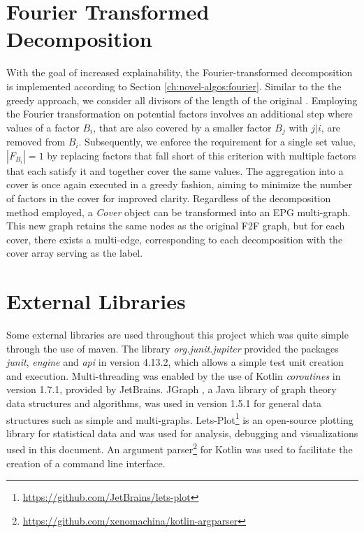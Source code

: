 \section{Fourier Transformed Decomposition}
\label{ch:Implementation:fourier-transform}
With the goal of increased explainability, the Fourier-transformed decomposition is implemented according to Section \ref{ch:novel-algos:fourier}.
Similar to the the greedy approach, we consider all divisors of the length of the original \DFA.
Employing the Fourier transformation on potential factors involves an additional step where values of a factor $B_i$, that are also covered by a smaller factor $B_j$ with $j|i$, are removed from $B_i$.
Subsequently, we enforce the requirement for a single set value, $|F_{B_i}| = 1$ by replacing factors that fall short of this criterion with multiple factors that each satisfy it and together cover the same values.
The aggregation into a cover is once again executed in a greedy fashion, aiming to minimize the number of factors in the cover for improved clarity.
Regardless of the decomposition method employed, a \textit{Cover} object can be transformed into an EPG multi-graph.
This new graph retains the same nodes as the original F2F graph, but for each cover, there exists a multi-edge, corresponding to each decomposition with the cover array serving as the label.

\section{External Libraries}
\label{ch:Implementation:external-libs}
Some external libraries are used throughout this project which was quite simple through the use of maven.
The library \emph{org.junit.jupiter} provided the packages \emph{junit}, \emph{engine} and \emph{api} in version 4.13.2, which allows a simple test unit creation and execution. Multi-threading was enabled by the use of Kotlin \emph{coroutines} in version 1.7.1, provided by JetBrains.
JGraph \cite{DBLP:journals/corr/abs-1904-08355}, a Java library of graph theory data structures and algorithms, was used in version 1.5.1 for general data structures such as simple and multi-graphs.
Lets-Plot\footnote{\url{https://github.com/JetBrains/lets-plot}} is an open-source plotting library for statistical data and was used for analysis, debugging and visualizations used in this document.
An argument parser\footnote{\url{https://github.com/xenomachina/kotlin-argparser}} for Kotlin was used to facilitate the creation of a command line interface.

